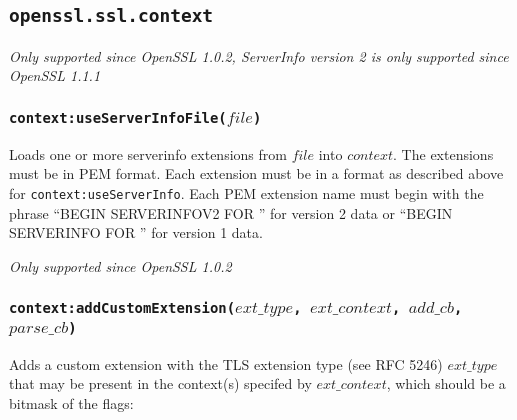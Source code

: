\documentclass[11pt, oneside]{memoir}
\newcommand*{\fn}[1]{\texttt{#1}\xspace}
\newcounter{toccols}
\newenvironment{Module}[1]{
	\subsection{\texttt{#1}}
	\addtocontents{toc}{
		\protect\begin{multicols}{\value{toccols}}
	}
}{
	\addtocontents{toc}{\protect\end{multicols}}
}
\begin{document}
\begin{Module}{openssl.ssl.context}
\emph{Only supported since OpenSSL 1.0.2, ServerInfo version 2 is only supported since OpenSSL 1.1.1}

\subsubsection[\fn{context:useServerInfoFile}]{\fn{context:useServerInfoFile($file$)}}

Loads one or more serverinfo extensions from $file$ into $context$. The extensions must be in PEM format. Each extension must be in a format as described above for \fn{context:useServerInfo}. Each PEM extension name must begin with the phrase ``BEGIN SERVERINFOV2 FOR '' for version 2 data or ``BEGIN SERVERINFO FOR '' for version 1 data.

\emph{Only supported since OpenSSL 1.0.2}

\subsubsection[\fn{context:addCustomExtension}]{\fn{context:addCustomExtension($ext\_type$, $ext\_context$, $add\_cb$, $parse\_cb$)}}

Adds a custom extension with the TLS extension type (see RFC 5246) $ext\_type$ that may be present in the context(s) specifed by $ext\_context$, which should be a bitmask of the flags:


\end{Module}
\end{document}
